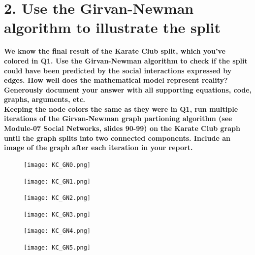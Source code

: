 \documentclass[12pt]{article}
\begin{document}
\section*{2. Use the Girvan-Newman algorithm to illustrate the split}
\noindent \textbf{We know the final result of the Karate Club split, which you've colored in Q1. Use the Girvan-Newman algorithm to check if the split could have been predicted by the social interactions expressed by edges. How well does the mathematical model represent reality? Generously document your answer with all supporting equations, code, graphs, arguments, etc.\\Keeping the node colors the same as they were in Q1, run multiple iterations of the Girvan-Newman graph partioning algorithm (see Module-07 Social Networks, slides 90-99) on the Karate Club graph until the graph splits into two connected components. Include an image of the graph after each iteration in your report.}

\begin{figure}
\centering
\begin{minipage}{.5\textwidth}
  \centering
  \texttt{[image: KC\_GN0.png]}
  \label{fig:GN0}
\end{minipage}%
\begin{minipage}{.5\textwidth}
  \centering
  \texttt{[image: KC\_GN1.png]}
  \label{fig:GN1}
\end{minipage}
\end{figure}

\begin{figure}
\centering
\begin{minipage}{.5\textwidth}
  \centering
  \texttt{[image: KC\_GN2.png]}
  \label{fig:GN2}
\end{minipage}%
\begin{minipage}{.5\textwidth}
  \centering
  \texttt{[image: KC\_GN3.png]}
  \label{fig:GN3}
\end{minipage}
\end{figure}

\begin{figure}
\centering
\begin{minipage}{.5\textwidth}
  \centering
  \texttt{[image: KC\_GN4.png]}
  \label{fig:GN4}
\end{minipage}%
\begin{minipage}{.5\textwidth}
  \centering
  \texttt{[image: KC\_GN5.png]}
  \label{fig:GN5}
\end{minipage}
\end{figure}
\end{document}
